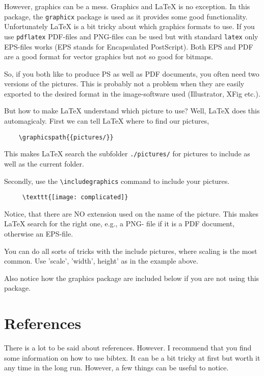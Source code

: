 However, graphics can be a mess. Graphics and {\LaTeX} is no 
exception. In this package, the \texttt{graphicx} package is used 
as it provides some good functionality. Unfortunately {\LaTeX} is a bit 
tricky about which graphics  formats to use. If you use 
\texttt{pdflatex} PDF-files and PNG-files can be used but with 
standard \texttt{latex} only EPS-files works (EPS stands for
Encapsulated PostScript). Both EPS and PDF are a good format for 
vector graphics but not so good for bitmaps. 

So, if you both like to produce PS as well as PDF documents, you
often need two versions of the pictures. This is probably not a
problem when they are easily exported to the desired format in the
image-software used (Illustrator, XFig etc.). 

But how to make {\LaTeX} understand which picture to use? Well, 
{\LaTeX} does this automagicaly. First we can tell {\LaTeX} where to 
find our pictures,
\begin{verbatim}
    \graphicspath{{pictures/}}
\end{verbatim} 
This makes {\LaTeX} search the subfolder \texttt{./pictures/} for 
pictures to include as well as the current folder.

Secondly, use the \verb+\includegraphics+ command to include your 
pictures. 

\begin{verbatim}
     \texttt{[image: complicated]}
\end{verbatim}

Notice, that there are NO extension used on the name of the
picture. This makes {\LaTeX} search for the right one, e.g., a PNG-
file if it is a PDF document, otherwise an EPS-file.

You can do all sorts of tricks with the include pictures, where
scaling is the most common. Use 'scale', 'width', height' as in the
example above.

Also notice how the graphics package are included below if you are
not using this package.

\section{References}

There is a lot to be said about references. However. I recommend
that you find some information on how to use bibtex. It can be a bit
tricky at first but worth it any time in the long run. However, a
few things can be useful to notice.

